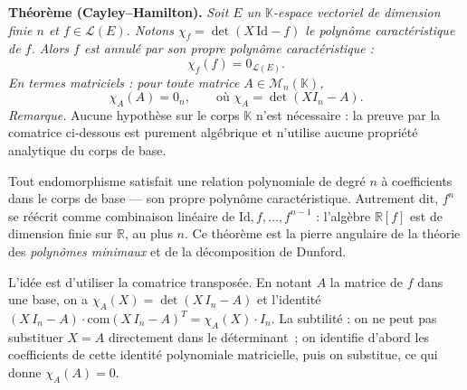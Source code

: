 ﻿%



\begin{tcolorbox}[thmbox]
  \textbf{Théorème (Cayley--Hamilton).}\enspace%
  \textit{Soit $E$ un $\mathbb{K}$-espace vectoriel de dimension finie $n$ et
  $f \in \mathcal{L}(E)$. Notons $\chi_f = \det(X\,\mathrm{Id} - f)$ le
  polynôme caractéristique de $f$.
  Alors $f$ est annulé par son propre polynôme caractéristique :}
  \[
    \chi_f(f) = 0_{\mathcal{L}(E)}.
  \]
  \textit{En termes matriciels : pour toute matrice $A \in \mathcal{M}_n(\mathbb{K})$,}
  \[
    \chi_A(A) = 0_n, \qquad \text{où } \chi_A = \det(XI_n - A).
  \]
  \textit{Remarque.} Aucune hypothèse sur le corps $\mathbb{K}$ n'est
  nécessaire : la preuve par la comatrice ci-dessous est purement
  algébrique et n'utilise aucune propriété analytique du corps de base.
\end{tcolorbox}

\begin{significationintuitive}
Tout endomorphisme satisfait une relation polynomiale de degré $n$ à
coefficients dans le corps de base — son propre polynôme caractéristique.
Autrement dit, $f^n$ se réécrit comme combinaison linéaire de
$\mathrm{Id}, f, \ldots, f^{n-1}$ : l'algèbre $\mathbb{R}[f]$ est
de dimension finie sur $\mathbb{R}$, au plus $n$. Ce théorème est la
pierre angulaire de la théorie des \emph{polynômes minimaux}
et de la décomposition de Dunford.
\end{significationintuitive}

\decsep{}


\begin{ideepreuve}
L'idée est d'utiliser la comatrice transposée. En notant $A$ la matrice
de $f$ dans une base, on a $\chi_A(X) = \det(X\,I_n-A)$ et l'identité
$(X\,I_n-A)\cdot{\mathrm{com}(X\,I_n-A)}^T = \chi_A(X)\cdot I_n$.
La subtilité : on ne peut pas substituer $X = A$ directement dans le
déterminant~; on identifie d'abord les coefficients de cette identité
polynomiale matricielle, puis on substitue, ce qui donne $\chi_A(A) = 0$.
\end{ideepreuve}

